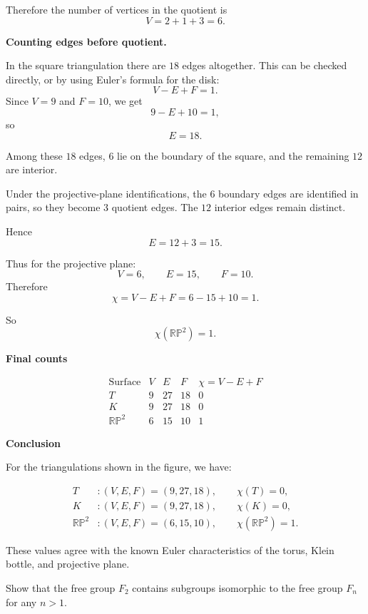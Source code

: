 \begin{solution}
Therefore the number of vertices in the quotient is
\[
V = 2 + 1 + 3 = 6.
\]

\par

\textbf{Counting edges before quotient.}

In the square triangulation there are \(18\) edges altogether. This can be checked directly, or by using Euler's formula for the disk:
\[
V-E+F=1.
\]
Since \(V=9\) and \(F=10\), we get
\[
9-E+10=1,
\]
so
\[
E=18.
\]

Among these \(18\) edges, \(6\) lie on the boundary of the square, and the remaining \(12\) are interior.

Under the projective-plane identifications, the \(6\) boundary edges are identified in pairs, so they become \(3\) quotient edges. The \(12\) interior edges remain distinct.

Hence
\[
E = 12+3=15.
\]

Thus for the projective plane:
\[
V=6,\qquad E=15,\qquad F=10.
\]
Therefore
\[
\chi = V-E+F = 6-15+10 = 1.
\]

So
\[
\boxed{\chi(\mathbb{RP}^2)=1}.
\]


\medskip
\noindent\textbf{Final counts}\par
\smallskip


\[
\begin{array}{c|c|c|c|c}
	\text{Surface} & V & E & F & \chi=V-E+F\\
	\hline
	T & 9 & 27 & 18 & 0\\
	K & 9 & 27 & 18 & 0\\
	\mathbb{RP}^2 & 6 & 15 & 10 & 1
\end{array}
\]


\medskip
\noindent\textbf{Conclusion}\par
\smallskip


For the triangulations shown in the figure, we have:

\[
\boxed{
	\begin{aligned}
		T &: (V,E,F)=(9,27,18),\qquad \chi(T)=0,\\
		K &: (V,E,F)=(9,27,18),\qquad \chi(K)=0,\\
		\mathbb{RP}^2 &: (V,E,F)=(6,15,10),\qquad \chi(\mathbb{RP}^2)=1.
\end{aligned}}
\]

These values agree with the known Euler characteristics of the torus, Klein bottle, and projective plane.
\end{solution}

\begin{problem}
Show that the free group \(F_2\) contains subgroups isomorphic to the free group \(F_n\) for any \(n>1\).

\par
\end{problem}

